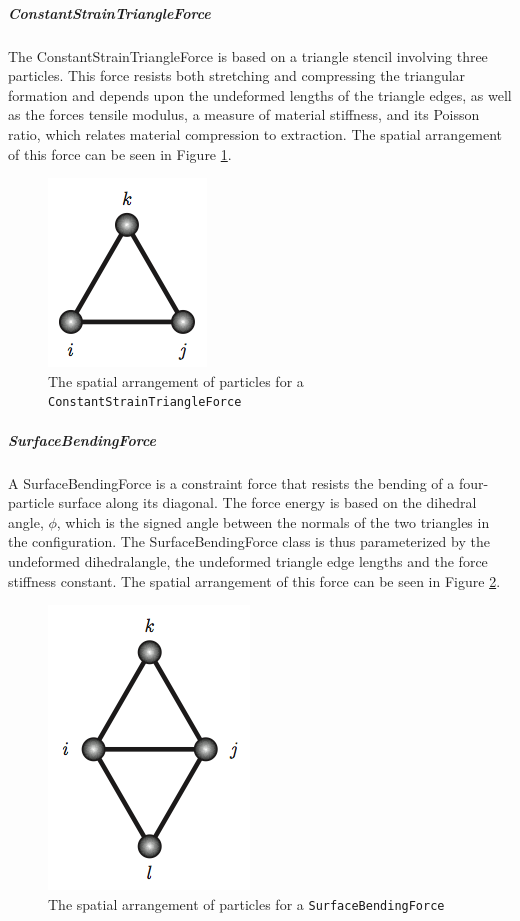 \subparagraph{ConstantStrainTriangleForce}

The ConstantStrainTriangleForce is based on a triangle stencil
involving three particles. This force resists both stretching and
compressing the triangular formation and depends upon the undeformed
lengths of the triangle edges, as well as the forces tensile modulus,
a measure of material stiffness, and its Poisson ratio, which relates
material compression to extraction. The spatial arrangement of this
force can be seen in Figure \ref{fig:trianglef}.

\begin{figure}
  \centering
  \includegraphics{figures/Triangle}
  \caption{The spatial arrangement of particles for a \texttt{ConstantStrainTriangleForce}}
  \label{fig:trianglef}
\end{figure}

\subparagraph{SurfaceBendingForce}

A SurfaceBendingForce is a constraint force that resists the bending
of a four-particle surface along its diagonal. The force energy is
based on the dihedral angle, $\phi$, which is the signed angle between
the normals of the two triangles in the configuration. The
SurfaceBendingForce class is thus parameterized by the undeformed
dihedralangle, the undeformed triangle edge lengths and the force
stiffness constant. The spatial arrangement of this force can be seen
in Figure \ref{fig:surfacef}.

\begin{figure}
  \centering
  \includegraphics{figures/SurfaceBending}
  \caption{The spatial arrangement of particles for a \texttt{SurfaceBendingForce}}
  \label{fig:surfacef}
\end{figure}

